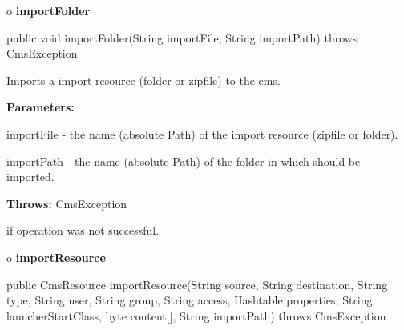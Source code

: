 o {\bf importFolder}

\begin{PRE}
 public void importFolder(String importFile,
                          String importPath) throws CmsException
\end{PRE}

\begin{description}
\htmlDD Imports a import-resource (folder or zipfile) to the cms.

\begin{description}
\item {\bf Parameters:}

importFile - the name (absolute Path) of the import resource (zipfile or
folder).

importPath - the name (absolute Path) of the folder in which should be
imported.
\item {\bf Throws:} CmsException

if operation was not successful.
\end{description}

\end{description}

o {\bf importResource}

\begin{PRE}
 public CmsResource importResource(String source,
                                   String destination,
                                   String type,
                                   String user,
                                   String group,
                                   String access,
                                   Hashtable properties,
                                   String launcherStartClass,
                                   byte content[],
                                   String importPath) throws CmsException
\end{PRE}

